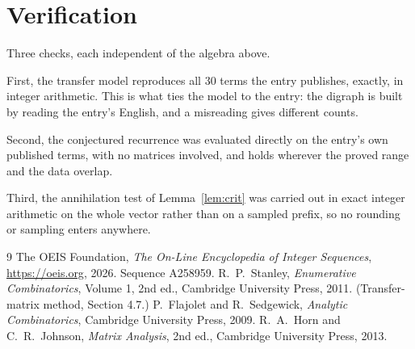 \documentclass[11pt,a4paper]{article}
\theoremstyle{plain}
\theoremstyle{definition}
\begin{document}
\section{Verification}

Three checks, each independent of the algebra above.

First, the transfer model reproduces all $30$ terms the entry publishes, exactly, in
integer arithmetic. This is what ties the model to the entry: the digraph is built by reading
the entry's English, and a misreading gives different counts.

Second, the conjectured recurrence was evaluated directly on the entry's own published terms,
with no matrices involved, and holds wherever the proved range and the data overlap.

Third, the annihilation test of Lemma~\ref{lem:crit} was carried out in exact integer
arithmetic on the whole vector rather than on a sampled prefix, so no rounding or sampling
enters anywhere.

\begin{thebibliography}{9}
 The OEIS Foundation, \emph{The On-Line Encyclopedia of Integer
Sequences}, \url{https://oeis.org}, 2026. Sequence A258959.
 R.~P.~Stanley, \emph{Enumerative Combinatorics}, Volume 1, 2nd ed.,
Cambridge University Press, 2011. (Transfer-matrix method, Section 4.7.)
 P.~Flajolet and R.~Sedgewick, \emph{Analytic Combinatorics}, Cambridge
University Press, 2009.
 R.~A.~Horn and C.~R.~Johnson, \emph{Matrix Analysis}, 2nd ed., Cambridge
University Press, 2013.
\end{thebibliography}
\end{document}
